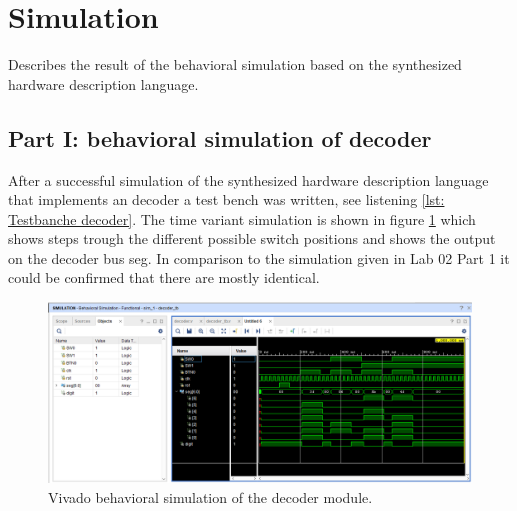 \section{Simulation} \label{sec: Simulation}
Describes the result of the behavioral simulation based on the synthesized hardware description language.

\subsection{Part I: behavioral simulation of decoder} \label{subsec: Part I: behavioral simulation of decoder}
After a successful simulation of the synthesized hardware description language that implements an decoder a test bench was written, see listening \ref{lst: Testbanche decoder}. The time variant simulation is shown in figure \ref{fig: Vivado_lab1_BS} which shows steps trough the different possible switch positions and shows the output on the decoder bus seg. In comparison to the simulation given in Lab 02 Part 1 it could be confirmed that there are mostly identical.

\begin{figure}[ht]
	\centering
	\includegraphics[width=1.0\textwidth ]{01_images/Vivado_lab1_BS.PNG}
	\caption{Vivado behavioral simulation of the decoder module.}
	\label{fig: Vivado_lab1_BS}
\end{figure}


